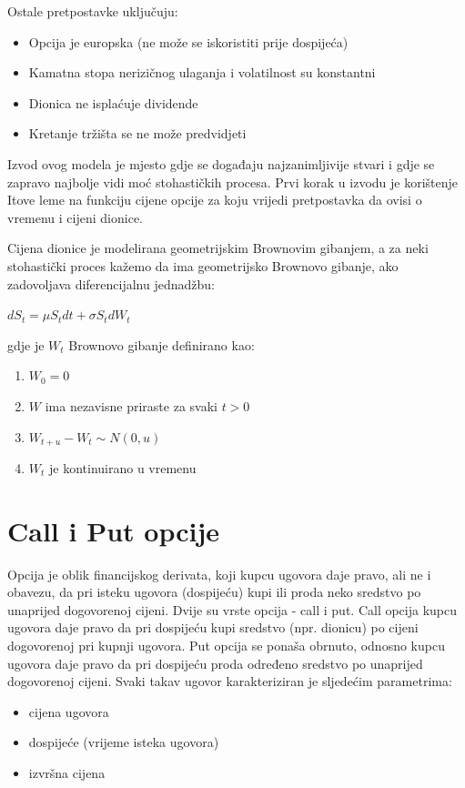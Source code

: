 \documentclass[times, utf8, seminar]{fer}
\begin{document}
\noindent Ostale pretpostavke uključuju:
\begin{itemize}
    \item[\textbullet] Opcija je europska (ne može se iskoristiti prije dospijeća)
    \item[\textbullet] Kamatna stopa nerizičnog ulaganja i volatilnost su konstantni
    \item[\textbullet] Dionica ne isplaćuje dividende
    \item[\textbullet] Kretanje tržišta se ne može predvidjeti
\end{itemize}

Izvod ovog modela je mjesto gdje se događaju najzanimljivije stvari i gdje se zapravo najbolje vidi moć stohastičkih procesa. Prvi korak u izvodu je korištenje Itove leme na funkciju cijene opcije za koju vrijedi pretpostavka da ovisi o vremenu i cijeni dionice.

Cijena dionice je modelirana geometrijskim Brownovim gibanjem, a za neki stohastički proces kažemo da ima geometrijsko Brownovo gibanje, ako zadovoljava diferencijalnu jednadžbu:

\begin{centering}
    $dS_t = \mu S_t dt + \sigma S_t dW_t$ \\
\end{centering}

\noindent gdje je $W_t$ Brownovo gibanje definirano kao:
\begin{enumerate}
    \item $W_0 = 0$
    \item $W$ ima nezavisne priraste za svaki $t > 0$
    \item $W_{t+u} - W_t \sim N(0, u)$
    \item $W_t$ je kontinuirano u vremenu
\end{enumerate}

\section{Call i Put opcije}
Opcija je oblik financijskog derivata, koji kupcu ugovora daje pravo, ali ne i obavezu, da pri isteku ugovora (dospijeću) kupi ili proda neko sredstvo po unaprijed dogovorenoj cijeni. Dvije su vrste opcija - call i put. Call opcija kupcu ugovora daje pravo da pri dospijeću kupi sredstvo (npr. dionicu) po cijeni dogovorenoj pri kupnji ugovora. Put opcija se ponaša obrnuto, odnosno kupcu ugovora daje pravo da pri dospijeću proda određeno sredstvo po unaprijed dogovorenoj cijeni. Svaki takav ugovor karakteriziran je sljedećim parametrima:
\begin{itemize}
    \item[\textbullet] cijena ugovora
    \item[\textbullet] dospijeće (vrijeme isteka ugovora)
    \item[\textbullet] izvršna cijena
\end{itemize}
\end{document}
